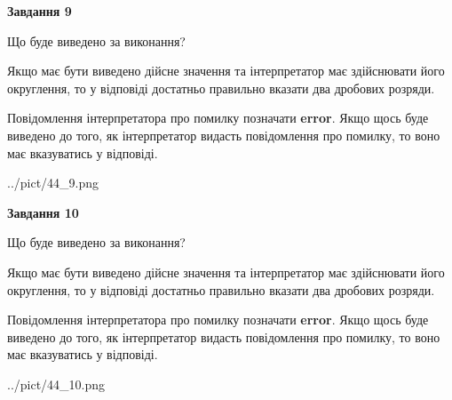 \documentclass[12pt, ukrainian]{article}
\begin{document}
{\begin {Large}
{\begin {center}\textbf{Завдання 9}\end {center}}\par
Що буде виведено за виконання? \par

Якщо має бути виведено дійсне значення та інтерпретатор має здійснювати його округлення, 
то у відповіді достатньо правильно вказати два дробових розряди.

Повідомлення інтерпретатора про помилку позначати \textbf{error}.
Якщо щось буде виведено до того, як інтерпретатор видасть повідомлення про помилку, 
то воно має вказуватись у відповіді. \par

\begin{center}
	{../pict/44_9.png}
\end{center}
\newpage

{\begin {center}\textbf{Завдання 10}\end {center}}\par
Що буде виведено за виконання? \par

Якщо має бути виведено дійсне значення та інтерпретатор має здійснювати його округлення, 
то у відповіді достатньо правильно вказати два дробових розряди.

Повідомлення інтерпретатора про помилку позначати \textbf{error}.
Якщо щось буде виведено до того, як інтерпретатор видасть повідомлення про помилку, 
то воно має вказуватись у відповіді. \par

\begin{center}
	{../pict/44_10.png}
\end{center}
\newpage

\end {Large}}
\end{document}

